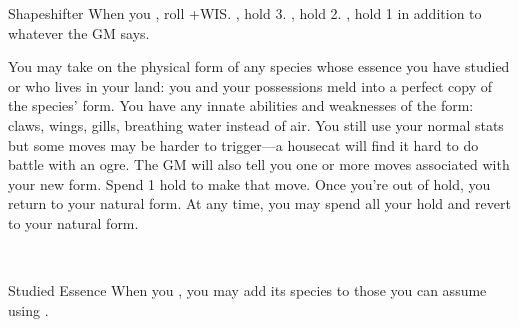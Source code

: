 \documentclass[8pt]{extarticle}
\begin{document}
\begin{minipage}[t]{4.6in}
\begin{basicmove}{Shapeshifter}
  When you ,
  roll +WIS. \onSuccess, hold 3. \onPartial, hold 2. \onMiss, hold 1
  in addition to whatever the GM says.

  You may take on the physical form of any species whose essence you
  have studied or who lives in your land: you and your possessions
  meld into a perfect copy of the species’ form. You have any innate
  abilities and weaknesses of the form: claws, wings, gills, breathing
  water instead of air. You still use your normal stats but some moves
  may be harder to trigger—a housecat will find it hard to do battle
  with an ogre. The GM will also tell you one or more moves associated
  with your new form. Spend 1 hold to make that move. Once you’re out
  of hold, you return to your natural form. At any time, you may spend
  all your hold and revert to your natural form.
\end{basicmove}
\

\begin{basicmove}{Studied Essence}
  When you , you may add its species to those you can assume using
  .
\end{basicmove}


\vfill\null
\end{minipage}

\charlower
\clearpage

\gearbanner
\end{document}
